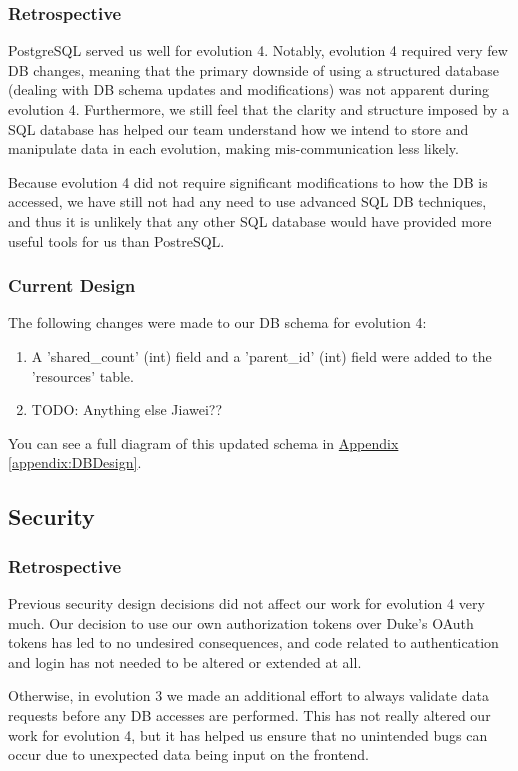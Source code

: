 \documentclass[12pt]{article}
\begin{document}
\subsubsection{Retrospective}
PostgreSQL served us well for evolution 4. Notably, evolution 4 required very few DB changes, meaning that the primary downside of using a structured database (dealing with DB schema updates and modifications) was not apparent during evolution 4. Furthermore, we still feel that the clarity and structure imposed by a SQL database has helped our team understand how we intend to store and manipulate data in each evolution, making mis-communication less likely. 

Because evolution 4 did not require significant modifications to how the DB is accessed, we have still not had any need to use advanced SQL DB techniques, and thus it is unlikely that any other SQL database would have provided more useful tools for us than PostreSQL. 


\subsubsection{Current Design}
The following changes were made to our DB schema for evolution 4:

\begin{enumerate}
    \item A 'shared_count' (int) field and a 'parent_id' (int) field were added to the 'resources' table. 
    \item TODO: Anything else Jiawei?? 
\end{enumerate}

You can see a full diagram of this updated schema in  \hyperref[appendix:DBDesign]{Appendix \ref{appendix:DBDesign}}. 

\subsection{Security}
\subsubsection{Retrospective}
Previous security design decisions did not affect our work for evolution 4 very much. Our decision to use our own authorization tokens over Duke's OAuth tokens has led to no undesired consequences, and code related to authentication and login has not needed to be altered or extended at all. 

Otherwise, in evolution 3 we made an additional effort to always validate data requests before any DB accesses are performed. This has not really altered our work for evolution 4, but it has helped us ensure that no unintended bugs can occur due to unexpected data being input on the frontend. 
\end{document}
